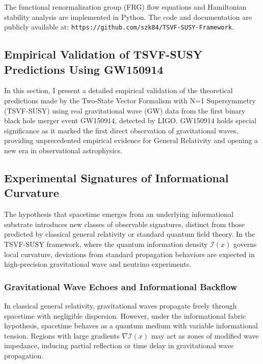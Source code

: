 \documentclass[twocolumn,superscriptaddress,floatfix]{revtex4-2}
\begin{document}
The functional renormalization group (FRG) flow equations and Hamiltonian stability analysis are implemented in Python. The code and documentation are publicly available at:  
\texttt{https://github.com/szk84/TSVF-SUSY-Framework}.  

\subsection{Empirical Validation of TSVF-SUSY Predictions Using GW150914}\label{sec:empirical_validation_gw150914}

In this section, I present a detailed empirical validation of the theoretical predictions made by the Two-State Vector Formalism with N=1 Supersymmetry (TSVF-SUSY) using real gravitational wave (GW) data from the first binary black hole merger event GW150914, detected by LIGO. GW150914 holds special significance as it marked the first direct observation of gravitational waves, providing unprecedented empirical evidence for General Relativity and opening a new era in observational astrophysics.

\subsection{Experimental Signatures of Informational Curvature}
\label{sec:infosignatures}

The hypothesis that spacetime emerges from an underlying informational substrate introduces new classes of observable signatures, distinct from those predicted by classical general relativity or standard quantum field theory. In the TSVF-SUSY framework, where the quantum information density $\mathcal{I}(x)$ governs local curvature, deviations from standard propagation behaviors are expected in high-precision gravitational wave and neutrino experiments.

\subsubsection{Gravitational Wave Echoes and Informational Backflow}

In classical general relativity, gravitational waves propagate freely through spacetime with negligible dispersion. However, under the informational fabric hypothesis, spacetime behaves as a quantum medium with variable informational tension. Regions with large gradients $\nabla \mathcal{I}(x)$ may act as zones of modified wave impedance, inducing partial reflection or time delay in gravitational wave propagation.
\end{document}
